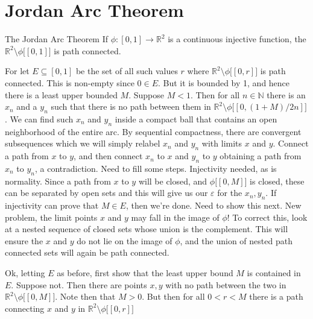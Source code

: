 \section{Jordan Arc Theorem}
    \begin{ftheorem}{The Jordan Arc Theorem}
        If $\phi:[0,1]\rightarrow\mathbb{R}^{2}$ is a continuous injective
        function, the $\mathbb{R}^{2}\setminus\phi\big[[0,1]\big]$ is path
        connected.
    \end{ftheorem}
    \begin{bproof}
        For let $E\subseteq[0,1]$ be the set of all such values $r$ where
        $\mathbb{R}^{2}\setminus\phi\big[[0,r]\big]$ is path connected. This is
        non-empty since $0\in{E}$. But it is bounded by 1, and hence there is a
        least upper bounded $M$. Suppose $M<1$. Then for all $n\in\mathbb{N}$
        there is an $x_{n}$ and a $y_{n}$ such that there is no path between
        them in $\mathbb{R}^{2}\setminus\phi\big[[0,(1+M)/2n]\big]$. We can find
        such $x_{n}$ and $y_{n}$ inside a compact ball that contains an open
        neighborhood of the entire arc. By sequential compactness, there are
        convergent subsequences which we will simply relabel $x_{n}$ and $y_{n}$
        with limits $x$ and $y$. Connect a path from $x$ to $y$, and then
        connect $x_{n}$ to $x$ and $y_{n}$ to $y$ obtaining a path from $x_{n}$
        to $y_{n}$, a contradiction. Need to fill some steps. Injectivity
        needed, as is normality. Since a path from $x$ to $y$ will be closed,
        and $\phi\big[[0,M]\big]$ is closed, these can be separated by open sets
        and this will give us our $\varepsilon$ for the $x_{n},y_{n}$. If
        injectivity can prove that $M\in{E}$, then we're done. Need to show this
        next. New problem, the limit points $x$ and $y$ may fall in the image of
        $\phi$! To correct this, look at a nested sequence of closed sets whose
        union is the complement. This will ensure the $x$ and $y$ do not lie on
        the image of $\phi$, and the union of nested path connected sets will
        again be path connected.
        \par\hfill\par
        Ok, letting $E$ as before, first show that the least upper bound $M$ is
        contained in $E$. Suppose not. Then there are points $x,y$ with no
        path between the two in $\mathbb{R}^{2}\setminus\phi\big[[0,M]\big]$.
        Note then that $M>0$. But then for all $0<r<M$ there is a path
        connecting $x$ and $y$ in $\mathbb{R}^{2}\setminus\phi\big[[0,r]\big]$

\end{bproof}
